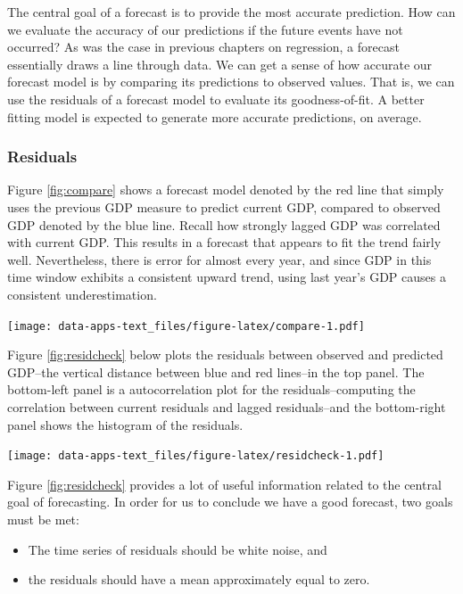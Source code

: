\documentclass[
]{book}
\providecommand{\tightlist}{%
  \setlength{\itemsep}{0pt}\setlength{\parskip}{0pt}}
\begin{document}
The central goal of a forecast is to provide the most accurate prediction. How can we evaluate the accuracy of our predictions if the future events have not occurred? As was the case in previous chapters on regression, a forecast essentially draws a line through data. We can get a sense of how accurate our forecast model is by comparing its predictions to observed values. That is, we can use the residuals of a forecast model to evaluate its goodness-of-fit. A better fitting model is expected to generate more accurate predictions, on average.

\hypertarget{residuals}{%
\subsubsection*{Residuals}\label{residuals}}

Figure \ref{fig:compare} shows a forecast model denoted by the red line that simply uses the previous GDP measure to predict current GDP, compared to observed GDP denoted by the blue line. Recall how strongly lagged GDP was correlated with current GDP. This results in a forecast that appears to fit the trend fairly well. Nevertheless, there is error for almost every year, and since GDP in this time window exhibits a consistent upward trend, using last year's GDP causes a consistent underestimation.

\texttt{[image: data-apps-text\_files/figure-latex/compare-1.pdf]}

Figure \ref{fig:residcheck} below plots the residuals between observed and predicted GDP--the vertical distance between blue and red lines--in the top panel. The bottom-left panel is a autocorrelation plot for the residuals--computing the correlation between current residuals and lagged residuals--and the bottom-right panel shows the histogram of the residuals.

\texttt{[image: data-apps-text\_files/figure-latex/residcheck-1.pdf]}

Figure \ref{fig:residcheck} provides a lot of useful information related to the central goal of forecasting. In order for us to conclude we have a good forecast, two goals must be met:

\begin{itemize}
\tightlist
\item
  The time series of residuals should be white noise, and
\item
  the residuals should have a mean approximately equal to zero.
\end{itemize}
\end{document}
